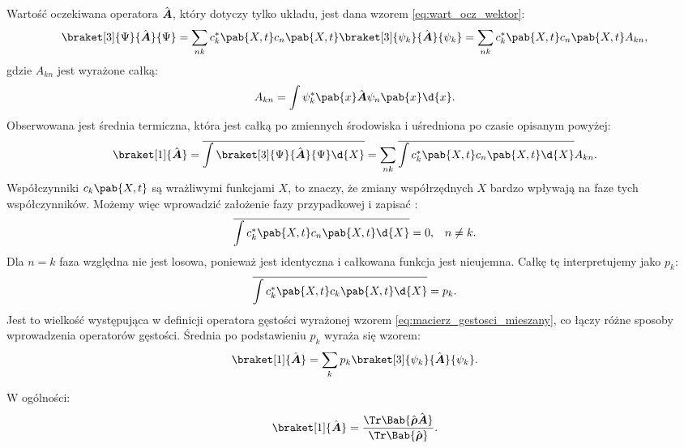 Wartość oczekiwana operatora \(\vu{A}\), który dotyczy tylko układu, jest dana wzorem \eqref{eq:wart_ocz_wektor}:
\begin{equation}
	\braket[3]{\Psi}{\vu{A}}{\Psi} =
	\sum_{nk} c_{k}^{*}\pab{X,t}c_{n}\pab{X,t} \braket[3]{\psi_k}{\vu{A}}{\psi_k} =
	\sum_{nk} c_{k}^{*}\pab{X,t}c_{n}\pab{X,t} A_{kn},
\end{equation}
gdzie \(A_{kn}\) jest wyrażone całką:
\begin{equation}
	A_{kn} = \int \psi_{k}^{*}\pab{x} \vu{A} \psi_{n}\pab{x} \d{x}.
\end{equation}
Obserwowana jest średnia termiczna, która jest całką po zmiennych środowiska i uśredniona po czasie opisanym powyżej:
\begin{equation}
	\braket[1]{\vu{A}} =
	\overline{\int \braket[3]{\Psi}{\vu{A}}{\Psi} \d{X}} =
	\sum_{nk} \overline{\int c_{k}^{*}\pab{X,t}c_{n}\pab{X,t} \d{X}} A_{kn}.
\end{equation}
Współczynniki \(c_{k}\pab{X,t}\) są wrażliwymi funkcjami \(X\), to znaczy, że zmiany współrzędnych \(X\) bardzo wpływają na faze tych współczynników. Możemy więc wprowadzić założenie fazy przypadkowej i zapisać \cite{b:huang_mechanika_statystyczna}:
\begin{align}
	\overline{\int c_{k}^{*}\pab{X,t}c_{n}\pab{X,t} \d{X}} &= 0, &
	n \neq k.
\end{align}
Dla \(n = k\) faza względna nie jest losowa, ponieważ jest identyczna i całkowana funkcja jest nieujemna. Całkę tę interpretujemy jako \(p_k\):
\begin{equation}
	\overline{\int c_{k}^{*}\pab{X,t}c_{k}\pab{X,t} \d{X}} = p_k.
\end{equation}
Jest to wielkość występująca w definicji operatora gęstości wyrażonej wzorem \eqref{eq:macierz_gestosci_mieszany}, co łączy różne sposoby wprowadzenia operatorów gęstości. Średnia po podstawieniu \(p_k\) wyraża się wzorem:
\begin{equation}
	\braket[1]{\vu{A}} = \sum_{k} p_k \braket[3]{\psi_k}{\vu{A}}{\psi_k}.
\end{equation}

W ogólności:
\begin{equation}
	\braket[1]{\vu{A}} = \frac{\Tr\Bab{\vu{\rho}\vu{A}}}{\Tr\Bab{\vu{\rho}}}.
\end{equation}


